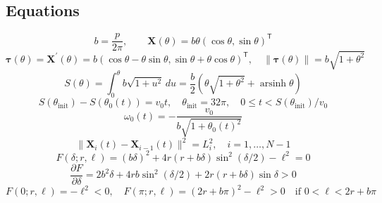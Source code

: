 \subsection*{Equations}
\begin{equation}
b=\frac{p}{2\pi},\qquad \mathbf X(\theta)=b\theta(\cos\theta,\sin\theta)^{\mathsf T}
\label{eq:spiral}
\end{equation}
\begin{equation}
\boldsymbol\tau(\theta)=\mathbf X^{\prime}(\theta)=b(\cos\theta-\theta\sin\theta,\sin\theta+\theta\cos\theta)^{\mathsf T},\quad \|\boldsymbol\tau(\theta)\|=b\sqrt{1+\theta^2}
\label{eq:tangent}
\end{equation}
\begin{equation}
S(\theta)=\int_0^\theta b\sqrt{1+u^2}\,du=\frac b2\left(\theta\sqrt{1+\theta^2}+\operatorname{arsinh}\theta\right)
\label{eq:arc}
\end{equation}
\begin{equation}
\boxed{S(\theta_{\mathrm{init}})-S(\theta_0(t))=v_0t},\quad \theta_{\mathrm{init}}=32\pi,\quad 0\le t<S(\theta_{\mathrm{init}})/v_0
\label{eq:head}
\end{equation}
\begin{equation}
\boxed{\omega_0(t)=-\frac{v_0}{b\sqrt{1+\theta_0(t)^2}}}
\label{eq:head-ode}
\end{equation}
\begin{equation}
\|\mathbf X_i(t)-\mathbf X_{i-1}(t)\|^2=L_i^2,\quad i=1,\ldots,N-1
\label{eq:rod}
\end{equation}
\begin{equation}
\boxed{F(\delta;r,\ell)=(b\delta)^2+4r(r+b\delta)\sin^2(\delta/2)-\ell^2=0}
\label{eq:stable-chord}
\end{equation}
\begin{equation}
\frac{\partial F}{\partial\delta}=2b^2\delta+4rb\sin^2(\delta/2)+2r(r+b\delta)\sin\delta>0
\label{eq:chord-derivative}
\end{equation}
\begin{equation}
F(0;r,\ell)=-\ell^2<0,\quad F(\pi;r,\ell)=(2r+b\pi)^2-\ell^2>0\quad\text{if }0<\ell<2r+b\pi
\label{eq:bracket}
\end{equation}
